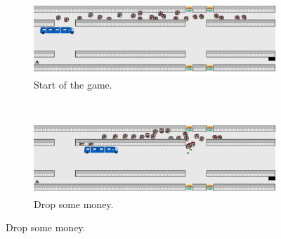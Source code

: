 \documentclass[a4paper,pdf,12pt]{article}
\begin{document}
\begin{figure}
        \centering
        \begin{subfigure}[b]{0.4\textwidth}
                \centering
                \includegraphics[width=\textwidth]{../screenshots/screenshot_5336.png}
                \caption{Start of the game.}
                \label{fig:screenshot01}
        \end{subfigure}%
        ~ %
        \begin{subfigure}[b]{0.4\textwidth}
                \centering
                \includegraphics[width=\textwidth]{../screenshots/screenshot_9475.png}
                \caption{Drop some money.}
                \label{fig:screenshot02}
        \end{subfigure}


\end{figure}
\end{document}
